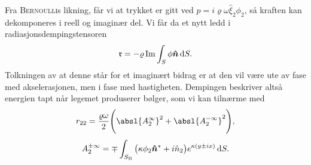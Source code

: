 Fra \textsc{Bernoulli}s likning, får vi at trykket er gitt ved $p = i\varrho\omega\hat{\xi}_2 \phi_2$, så kraften kan dekomponeres i reell og imaginær del.
Vi får da et nytt ledd i radiasjonsdempingstensoren
\[
\mathfrak{r} = -\varrho \operatorname{Im} \int_S \phi \bm{\hat{n}} \,\mathrm{d} S.
\]
Tolkningen av at denne står for et imaginært bidrag er at den vil være ute av fase med akselerasjonen, men i fase med hastigheten.
Dempingen beskriver altså energien tapt når legemet produserer bølger, som vi kan tilnærme med
\[
r_{22} = \frac{\varrho \omega}{2} \Bigg( {\absl{A_2^{\infty}}}^2 + {\absl{A_2^{-\infty}}}^2 \Bigg),
\]
\[
A_2^{\pm\infty} = \mp\int_{S_{\mathrm{B}}} \big( \kappa\phi_2\bm{\hat{n}}^{\ast} + i{\hat{n}}_2 \big) e^{\kappa(y\pm ix)}\,\mathrm{d} S.
\]
